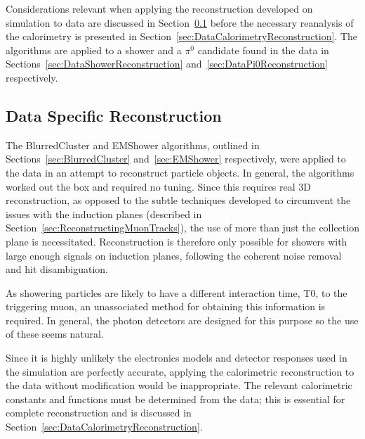 Considerations relevant when applying the reconstruction developed on simulation to data are discussed in Section~\ref{sec:DataSpecificReconstruction} before the necessary reanalysis of the calorimetry is presented in Section~\ref{sec:DataCalorimetryReconstruction}.  The algorithms are applied to a shower and a $\pi^0$ candidate found in the data in Sections~\ref{sec:DataShowerReconstruction} and~\ref{sec:DataPi0Reconstruction} respectively.

\subsection{Data Specific Reconstruction}\label{sec:DataSpecificReconstruction}

The BlurredCluster and EMShower algorithms, outlined in Sections~\ref{sec:BlurredCluster} and~\ref{sec:EMShower} respectively, were applied to the data in an attempt to reconstruct particle objects.  In general, the algorithms worked out the box and required no tuning.  Since this requires real 3D reconstruction, as opposed to the subtle techniques developed to circumvent the issues with the induction planes (described in Section~\ref{sec:ReconstructingMuonTracks}), the use of more than just the collection plane is necessitated.  Reconstruction is therefore only possible for showers with large enough signals on induction planes, following the coherent noise removal and hit disambiguation.

As showering particles are likely to have a different interaction time, T0, to the triggering muon, an unassociated method for obtaining this information is required.  In general, the photon detectors are designed for this purpose so the use of these seems natural.

Since it is highly unlikely the electronics models and detector responses used in the simulation are perfectly accurate, applying the calorimetric reconstruction to the data without modification would be inappropriate.  The relevant calorimetric constants and functions must be determined from the data; this is essential for complete reconstruction and is discussed in Section~\ref{sec:DataCalorimetryReconstruction}.

